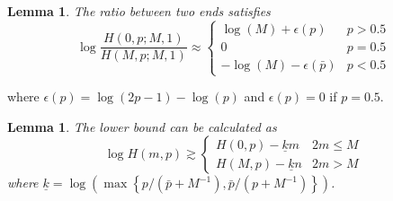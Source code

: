\documentclass{article}
\newtheorem{lemma}[theorem]{Lemma}
\begin{document}
\begin{lemma}
\label{Ratio1}
The ratio between two ends satisfies
$$\log\frac{H(0,p;M,1)}{H(M,p;M,1)} \approx \left\{
    \begin{array}{cl}
    \log(M)+\epsilon(p) & p>0.5\\
    0 & p=0.5\\
    -\log(M)-\epsilon(\bar{p}) & p<0.5
    \end{array}\right.$$
\end{lemma}
where $\epsilon(p)=\log(2p-1)-\log(p)$ and $\epsilon(p)=0$ if $p=0.5$.
\begin{lemma}
\label{LowBound1}
The lower bound can be calculated as
\begin{equation*}
\log H(m,p)\gtrsim \left\{
    \begin{array}{cl}
    H(0,p)- \underline{k}m& 2m\leq M\\
    H(M,p)- \underline{k}n& 2m>M
    \end{array}\right.
\end{equation*}
where $\underline{k}=\log\left(\max\left\{p/(\bar{p}+M^{-1}),\bar{p}/(p+M^{-1})\right\}\right)$.
\end{lemma}
\end{document}
